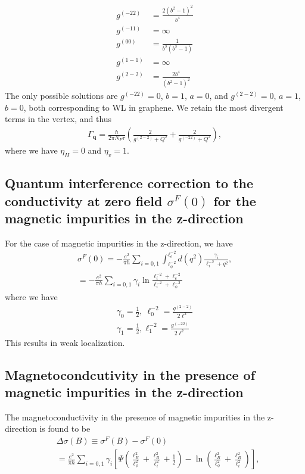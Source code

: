 \documentclass[aps,prb,amsmath,amssymb,footinbib,showpacs,twocolumn]{revtex4-2}
\begin{document}
\begin{widetext}
\begin{align}
    g^{(-22)}&=\frac{2 \left(b^2-1\right)^2}{b^4}\nonumber\\
    g^{(-11)}&=\infty\nonumber\\
    g^{(00)}&=\frac{1}{b^2 \left(b^2-1\right)}\nonumber\\
    g^{(1-1)}&=\infty\nonumber\\
    g^{(2-2)}&=\frac{2 b^4}{\left(b^2-1\right)^2}
\end{align}
The only possible solutions are $g^{(-22)}=0$, $b=1$, $a=0$, and $g^{(2-2)}=0$, $a=1$, $b=0$, both corresponding to WL in graphene. We retain the most divergent terms in the vertex, and thus 
\begin{align}
    \Gamma_{\mathbf{q}}=\frac{\hbar}{2\pi N_{F}\tau}\left(\frac{2}{g^{(2-2)}+Q^2 }+ \frac{2}{g^{(-22)}+Q^2}\right),
\end{align}
where we have $\eta_{H}=0$ and $\eta_{v}=1$.
\subsection{Quantum interference correction to the conductivity
at zero field $\sigma^{F}(0)$ for the magnetic impurities in the z-direction }
For the case of magnetic impurities in the z-direction, we have
\begin{align}
     \sigma^{F}(0)= -\frac{e^{2}}{\pi h}\sum_{i= 0,1}\int_{\ell^{-2}_{\phi}}^{\ell^{-2}_{e}}d(q^{2})\frac{\gamma_{i}}{\ell^{-2}_{i}+q^{2}}, \\
    = -\frac{e^{2}}{\pi h}\sum_{i=0,1}\gamma_{i} \ln\frac{\ell^{-2}_{i}+\ell^{-2}_{e}}{\ell^{-2}_{i}+\ell^{-2}_{\phi}}
\end{align}
where we have
\begin{align}
    \gamma_{0}=\frac{1}{2}, \ \ell_{0}^{-2}=\frac{g^{(2-2)}}{2\ell^{2}} \\
    \gamma_{1}=\frac{1}{2}, \ell_{1}^{-2}=\frac{g^{(-22)}}{2\ell^{2}} 
\end{align}
This results in weak localization.
\subsection{Magnetocondcutivity in the presence of magnetic impurities in the z-direction}
The magnetoconductivity in the presence of magnetic impurities in the z-direction is found to be
\begin{align}
    &\Delta\sigma(B) \equiv  \sigma^{F}(B)- \sigma^{F}(0) \nonumber\\ 
    &=\frac{e^{2}}{\pi h}\sum_{i=0,1}\gamma_{i}\left[\Psi\left(\frac{\ell^{2}_{B}}{\ell^{2}_{\phi}}+\frac{\ell^{2}_{B}}{\ell^{2}_{i}}+\frac{1}{2}\right)-\ln\left(\frac{\ell^{2}_{B}}{\ell^{2}_{\phi}}+\frac{\ell^{2}_{B}}{\ell^{2}_{i}}\right)\right],
\end{align}

\end{widetext}
\end{document}
